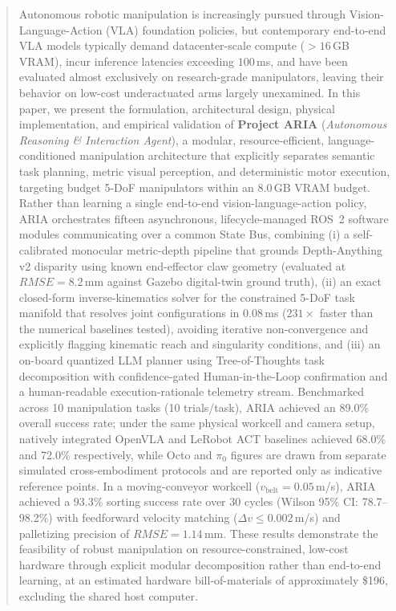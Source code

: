 \documentclass[journal]{IEEEtran}
\begin{document}
\begin{abstract}
Autonomous robotic manipulation is increasingly pursued through Vision-Language-Action (VLA) foundation policies, but contemporary end-to-end VLA models typically demand datacenter-scale compute ($>16$\,GB VRAM), incur inference latencies exceeding $100$\,ms, and have been evaluated almost exclusively on research-grade manipulators, leaving their behavior on low-cost underactuated arms largely unexamined. In this paper, we present the formulation, architectural design, physical implementation, and empirical validation of \textbf{Project ARIA} (\textit{Autonomous Reasoning \& Interaction Agent}), a modular, resource-efficient, language-conditioned manipulation architecture that explicitly separates semantic task planning, metric visual perception, and deterministic motor execution, targeting budget 5-DoF manipulators within an 8.0\,GB VRAM budget. Rather than learning a single end-to-end vision-language-action policy, ARIA orchestrates fifteen asynchronous, lifecycle-managed ROS~2 software modules communicating over a common State Bus, combining (i) a self-calibrated monocular metric-depth pipeline that grounds Depth-Anything v2 disparity using known end-effector claw geometry (evaluated at $RMSE = 8.2$\,mm against Gazebo digital-twin ground truth), (ii) an exact closed-form inverse-kinematics solver for the constrained 5-DoF task manifold that resolves joint configurations in $0.08$\,ms ($231\times$ faster than the numerical baselines tested), avoiding iterative non-convergence and explicitly flagging kinematic reach and singularity conditions, and (iii) an on-board quantized LLM planner using Tree-of-Thoughts task decomposition with confidence-gated Human-in-the-Loop confirmation and a human-readable execution-rationale telemetry stream. Benchmarked across 10 manipulation tasks (10 trials/task), ARIA achieved an 89.0\% overall success rate; under the same physical workcell and camera setup, natively integrated OpenVLA and LeRobot ACT baselines achieved 68.0\% and 72.0\% respectively, while Octo and $\pi_0$ figures are drawn from separate simulated cross-embodiment protocols and are reported only as indicative reference points. In a moving-conveyor workcell ($v_{\text{belt}}=0.05$\,m/s), ARIA achieved a 93.3\% sorting success rate over 30 cycles (Wilson 95\% CI: 78.7--98.2\%) with feedforward velocity matching ($\Delta v \le 0.002$\,m/s) and palletizing precision of $RMSE = 1.14$\,mm. These results demonstrate the feasibility of robust manipulation on resource-constrained, low-cost hardware through explicit modular decomposition rather than end-to-end learning, at an estimated hardware bill-of-materials of approximately \$196, excluding the shared host computer.
\end{abstract}
\end{document}

